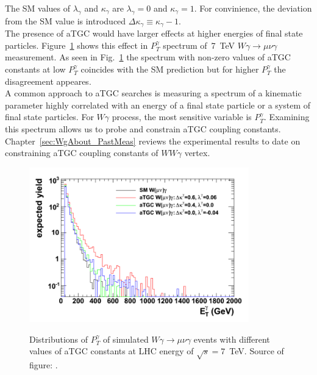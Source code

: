 The SM values of $\lambda_\gamma$ and $\kappa_\gamma$ are $\lambda_\gamma=0$ and $\kappa_\gamma=1$. For convinience, the deviation from the SM value is introduced $\Delta \kappa_\gamma \equiv \kappa_\gamma-1$.\\

The presence of aTGC would have larger effects at higher energies of final state particles. Figure~\ref{fig:aTGC_Pt_Wg} shows this effect in $P_T^\gamma$ spectrum of~7~TeV $W\gamma \rightarrow \mu\nu\gamma$ measurement. As seen in Fig.~\ref{fig:aTGC_Pt_Wg} the spectrum with non-zero values of aTGC constants at low $P_T^{\gamma}$ coincides with the SM prediction but for higher $P_T^{\gamma}$ the disagreement appeares.\\

A common approach to aTGC searches is measuring a spectrum of a kinematic parameter highly correlated with an energy of a final state particle or a system of final state particles. For $W\gamma$ process, the most sensitive variable is $P_T^\gamma$. Examining this spectrum allows us to probe and constrain aTGC coupling constants. Chapter~\ref{sec:WgAbout_PastMeas} reviews the experimental results to date on constraining aTGC coupling constants of $WW\gamma$ vertex.\\ 

\begin{figure}[htb]
  \begin{center}
    {\includegraphics[width=0.85\textwidth]{../figs/WgAbout/aTGC_Pt_Wg.png}}
    \caption{Distributions of $P_T^\gamma$ of simulated $W\gamma\rightarrow\mu\nu\gamma$ events with different values of aTGC constants at LHC energy of $\sqrt{s}=7$~TeV. Source of figure:  \cite{ref_Senka_thesis}.}
    \label{fig:aTGC_Pt_Wg}
  \end{center}
\end{figure}

